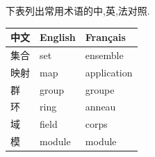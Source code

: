 
下表列出常用术语的中,英,法对照.

\begin{center}
\begin{tabular}{lll}
    中文 & English & Français \\
    \hline
    集合 & set & ensemble \\
    映射 & map & application \\
    群 & group & groupe \\
    环 & ring & anneau \\
    域 & field & corps \\
    模 & module & module \\
\end{tabular}
\end{center}
